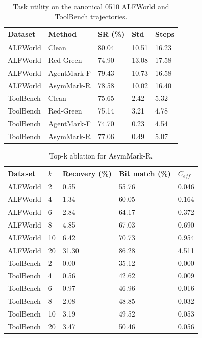 \begin{table}[t]
\centering
\small
\caption{Task utility on the canonical 0510 ALFWorld and ToolBench trajectories.}
\label{tab:utility-0510}
\begin{tabular}{lllll}
\toprule
Dataset & Method & SR (\%) & Std & Steps \\
\midrule
ALFWorld & Clean & 80.04 & 10.51 & 16.23 \\
ALFWorld & Red-Green & 74.90 & 13.08 & 17.58 \\
ALFWorld & AgentMark-F & 79.43 & 10.73 & 16.58 \\
ALFWorld & AsymMark-R & 78.58 & 10.02 & 16.40 \\
ToolBench & Clean & 75.65 & 2.42 & 5.32 \\
ToolBench & Red-Green & 75.14 & 3.21 & 4.78 \\
ToolBench & AgentMark-F & 74.70 & 0.23 & 4.54 \\
ToolBench & AsymMark-R & 77.06 & 0.49 & 5.07 \\
\bottomrule
\end{tabular}
\end{table}

\begin{table}[t]
\centering
\small
\caption{Top-k ablation for AsymMark-R.}
\label{tab:topk-0510}
\begin{tabular}{lllll}
\toprule
Dataset & $k$ & Recovery (\%) & Bit match (\%) & $C_{eff}$ \\
\midrule
ALFWorld & 2 & 0.55 & 55.76 & 0.046 \\
ALFWorld & 4 & 1.34 & 60.05 & 0.164 \\
ALFWorld & 6 & 2.84 & 64.17 & 0.372 \\
ALFWorld & 8 & 4.85 & 67.03 & 0.690 \\
ALFWorld & 10 & 6.42 & 70.73 & 0.954 \\
ALFWorld & 20 & 31.30 & 86.28 & 4.511 \\
ToolBench & 2 & 0.00 & 35.12 & 0.000 \\
ToolBench & 4 & 0.56 & 42.62 & 0.009 \\
ToolBench & 6 & 0.97 & 46.96 & 0.016 \\
ToolBench & 8 & 2.08 & 48.85 & 0.032 \\
ToolBench & 10 & 3.19 & 49.52 & 0.053 \\
ToolBench & 20 & 3.47 & 50.46 & 0.056 \\
\bottomrule
\end{tabular}
\end{table}

